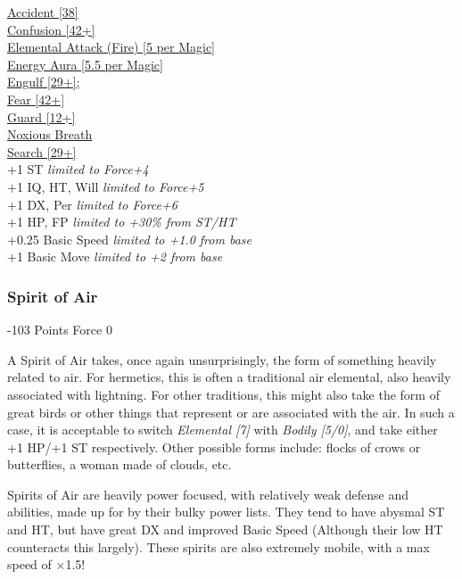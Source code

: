 \begin{multicols*}{3}
	\hyperref[accident]{Accident [38]}\\
	\hyperref[confusion]{Confusion [42+]}\\
	\hyperref[elemental_attack]{Elemental Attack (Fire) [5 per Magic]}\\
	\hyperref[energy_aura]{Energy Aura [5.5 per Magic]}\\
	\hyperref[engulf]{Engulf [29+];}\\	
	\hyperref[fear]{Fear [42+]}\\
	\hyperref[guard]{Guard [12+]}\\
	\hyperref[noxious_breath]{Noxious Breath}\\
	\hyperref[search]{Search [29+]}\\
	
	+1 ST \textit{limited to Force+4}\\
	+1 IQ, HT, Will \textit{limited to Force+5}\\
	+1 DX, Per \textit{limited to Force+6}\\
	+1 HP, FP \textit{limited to +30\% from ST/HT}\\
	+0.25 Basic Speed \textit{limited to +1.0 from base}\\
	+1 Basic Move \textit{limited to +2 from base}\\
	
	
	\subsubsection{Spirit of Air}
	\begin{flushright}
		 -103 Points Force 0
	\end{flushright}
	
	A Spirit of Air takes, once again unsurprisingly, the form of something heavily related to air. For hermetics, this is often a traditional air elemental, also heavily associated with lightning. For other traditions, this might also take the form of great birds or other things that represent or are associated with the air. In such a case, it is acceptable to switch \textit{Elemental [7]} with \textit{Bodily [5/0]}, and take either +1 HP/+1 ST respectively. Other possible forms include: flocks of crows or butterflies, a woman made of clouds, etc.
	
	Spirits of Air are heavily power focused, with relatively weak defense and abilities, made up for by their bulky power lists. They tend to have abysmal ST and HT, but have great DX and improved Basic Speed (Although their low HT counteracts this largely). These spirits are also extremely mobile, with a max speed of \(\times\)1.5!
	

\end{multicols*}
